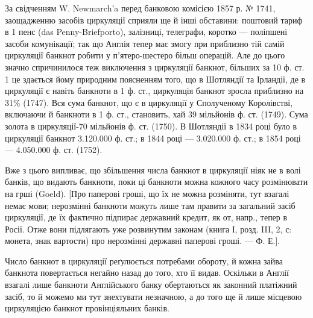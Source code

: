 За свідченням W. Newmarch’a перед банковою комісією 1857 р. № 1741,
заощадженню засобів циркуляції сприяли ще й інші обставини: поштовий тариф
в 1 пенс (das Penny-Briefporto), залізниці, телеграфи, коротко — поліпшені засоби
комунікації; так що Англія тепер має змогу при приблизно тій самій циркуляції
банкнот робити у п’ятеро-шестеро більш операцій. Але до цього значно
спричинилося теж виключення з циркуляції банкнот, більших за 10 ф. ст. 1 це
здається йому природним поясненням того, що в Шотляндії та Ірландії, де в
циркуляції є навіть банкноти в 1 ф. ст., циркуляція банкнот зросла приблизно
на 31\% (1747). Вся сума банкнот, що є в циркуляції у Сполученому Королівстві,
включаючи й банкноти в 1 ф. ст., становить, хай 39 мільйонів ф. ст.
(1749). Сума золота в циркуляції-70 мільйонів ф. ст. (1750). В Шотляндії
в 1834 році було в циркуляції банкнот 3.120.000 ф. ст.; в 1844 році —
3.020.000 ф. ст.; в 1854 році — 4.050.000 ф. ст. (1752).

Вже з цього випливає, що збільшення числа банкнот в циркуляції ніяк
не в волі банків, що видають банкноти, поки ці банкноти можна кожного часу
розмінювати на грші (Goeld). [Про паперові гроші, що їх не можна розміняти,
тут взагалі немає мови; нерозмінні банкноти можуть лише там правити за загальний
засіб циркуляції, де їх фактично підпирає державний кредит, як от, напр., тепер
в Росії. Отже вони підлягають уже розвинутим законам (книга І, розд. III, 2, с:
монета, знак вартости) про нерозмінні державні паперові гроші. — Ф. Е.].

Число банкнот в циркуляції реґулюється потребами обороту, й кожна
зайва банкнота повертається негайно назад до того, хто її видав. Оскільки в
Англії взагалі лише банкноти Англійського банку обертаються як законний
платіжний засіб, то й можемо ми тут знехтувати незначною, а до того ще й лише
місцевою циркуляцією банкнот провінціяльних банків.
